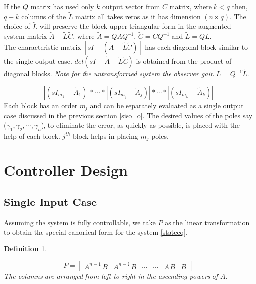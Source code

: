 \documentclass{elsarticle}
\newtheorem{Definition}{Definition}
\numberwithin{equation}{section}
\begin{document}
If the $Q$ matrix has used only $k$ output vector from $C$ matrix, where $k<q$ then, $q-k$ columns of the $\widetilde{L}$ matrix all takes zeros as it has dimension $(n \times q)$. The choice of $\widetilde{L}$ will preserve the block upper triangular form in the augmented system matrix $\widetilde{A} - \widetilde{L} \widetilde{C}$, where  $\widetilde{A}=QAQ^{-1}$, $\widetilde{C}=CQ^{-1}$ and $\widetilde{L}= QL$.\\

The characteristic matrix $\left[ sI-\left( \widetilde{A} - \widetilde{L} \widetilde{C} \right) \right] $ has each diagonal block similar to the single output case. $det(sI-\widetilde{A} + \widetilde{L} \widetilde{C})$ is obtained from the product of diagonal blocks. \textit{Note for the untransformed system the observer gain $L = Q^{-1} \widetilde{L}$}.
 
\begin{equation}\label{decoupleeq}
	\left|(sI_{m_1}-\widetilde{A}_1)\right|* \cdots *\left|(sI_{m_j}-\widetilde{A}_{j})		\right|*\cdots *\left|(sI_{m_k}-\widetilde{A}_k)\right|
\end{equation} 
Each block has an order $m_j$ and can be separately evaluated as a single output case discussed in the previous section \ref{siso_o}. The desired values of the poles say ($\gamma_1, \gamma_2, \cdots, \gamma_n$), to eliminate the error, as quickly as possible, is placed with the help of each block. $j^{th}$ block helps in placing $m_j$ poles.

\section{Controller Design}

\subsection{Single Input Case}

Assuming the system is fully controllable, we take $P$ as the linear transformation to obtain the special canonical form for the system \eqref{stateeq}. \\

\begin{Definition}\label{Form2}

\begin{equation}\label{Controllability}
	P=\begin{bmatrix}
	A^{n-1}\,B & A^{n-2}\,B & \cdots & \cdots& A\,B & B
	\end{bmatrix}
\end{equation} 
The columns are arranged from left to right in the ascending powers of $A$. 

\end{Definition}
\end{document}
